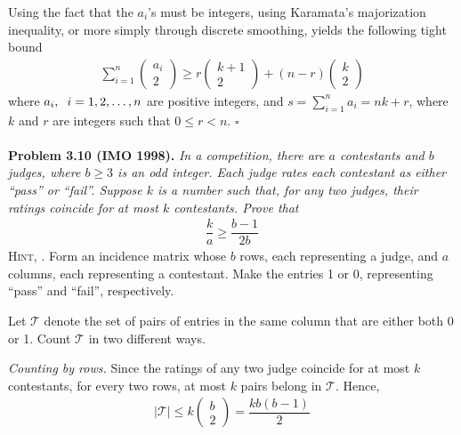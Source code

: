 \documentclass[a4paper,oneside]{article}
\numberwithin{equation}{section}
\begin{document}
Using the fact that the $a_i$'s must be integers, using Karamata's majorization inequality, or more simply through discrete smoothing, yields the following tight bound
\begin{align}
\sum\limits_{i = 1}^n {\left( {\begin{array}{*{20}{c}}
{{a_i}}\\
2
\end{array}} \right)}  \ge r\left( {\begin{array}{*{20}{c}}
{k + 1}\\
2
\end{array}} \right) + \left( {n - r} \right)\left( {\begin{array}{*{20}{c}}
k\\
2
\end{array}} \right)
\end{align}
where $a_i,\hspace{0.2cm}i=1,2,\ldots,n$ are positive integers, and $s = \sum\limits_{i = 1}^n {{a_i}}  = nk + r$, where $k$ and $r$ are integers such that $0\le r <n$. \hfill $\square$\\
\\
\textbf{Problem 3.10 (IMO 1998).} \textit{In a competition, there are $a$ contestants and $b$ judges, where $b \ge 3$ is an odd integer. Each judge rates each contestant as either ``pass'' or ``fail''. Suppose $k$ is a number such that, for any two judges, their ratings coincide for at most $k$ contestants. Prove that}
\begin{align}
\label{3.9}
\dfrac{k}{a} \ge \dfrac{{b - 1}}{{2b}}
\end{align} 
\textsc{Hint, \cite{1}.} Form an incidence matrix whose $b$ rows, each representing a judge, and $a$ columns, each representing a contestant. Make the entries 1 or 0, representing ``pass'' and ``fail'', respectively.

Let $\mathcal{T}$ denote the set of pairs of entries in the same column that are either both 0 or 1. Count $\mathcal{T}$ in two different ways.

\textit{Counting by rows.} Since the ratings of any two judge coincide for at most $k$ contestants, for every two rows, at most $k$ pairs belong in $\mathcal{T}$. Hence,
\begin{align}
\label{3.10}
\left| \mathcal{T} \right| \le k\left( {\begin{array}{*{20}{c}}
b\\
2
\end{array}} \right) = \dfrac{{kb\left( {b - 1} \right)}}{2}
\end{align}
\end{document}
